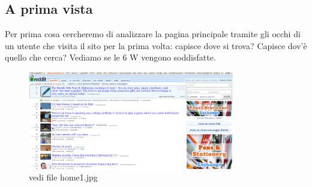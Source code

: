 \documentclass[12pt]{article}
\begin{document}
\subsection{A prima vista}
Per prima cosa cercheremo di analizzare la pagina principale tramite gli occhi di un utente che visita il sito per la prima volta: capisce dove si trova? Capisce dov'\`e quello che cerca? Vediamo se le 6 W vengono soddisfatte.
\begin{figure}[ht!]
\centering
\includegraphics[width=90mm]{home1}
\caption{vedi file home1.jpg}
\end{figure}
\end{document}
